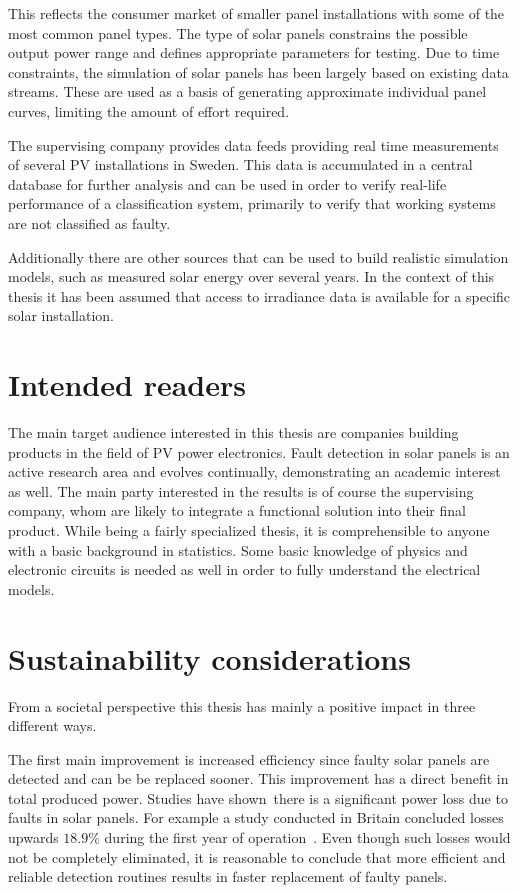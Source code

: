 This reflects the consumer market of smaller panel installations with some of the most common panel types.
The type of solar panels constrains the possible output power range and defines appropriate parameters for testing.
Due to time constraints, the simulation of solar panels has been largely based on existing data streams.
These are used as a basis of generating approximate individual panel curves, limiting the amount of effort required.

The supervising company provides data feeds providing real time measurements of several PV installations in Sweden.
This data is accumulated in a central database for further analysis and
can be used in order to verify real-life performance of a classification system, primarily to verify that working systems are not classified as faulty.

Additionally there are other sources that can be used to build realistic simulation models, such as measured solar energy over several years.
In the context of this thesis it has been assumed that access to irradiance data is available for a specific solar installation.

\section{Intended readers}
The main target audience interested in this thesis are companies building products in the field of PV power electronics.
Fault detection in solar panels is an active research area and evolves continually, demonstrating an academic interest as well.
The main party interested in the results is of course the supervising company, whom are likely to
integrate a functional solution into their final product.
While being a fairly specialized thesis, it is comprehensible to anyone with a basic background in statistics.
Some basic knowledge of physics and electronic circuits is needed as well in order to fully understand the electrical models.

\section{Sustainability considerations}
From a societal perspective this thesis has mainly a positive impact in three different ways.

The first main improvement is increased efficiency since faulty solar panels are detected and can be be replaced sooner.
This improvement has a direct benefit in total produced power.
Studies have shown there is a significant power loss due to faults in solar panels.
For example a study conducted in Britain concluded losses upwards $18.9\%$ during the first year of operation~\cite{Firth2010}.
Even though such losses would not be completely eliminated, it is reasonable to conclude that more efficient and reliable detection routines results in faster replacement of faulty panels.

